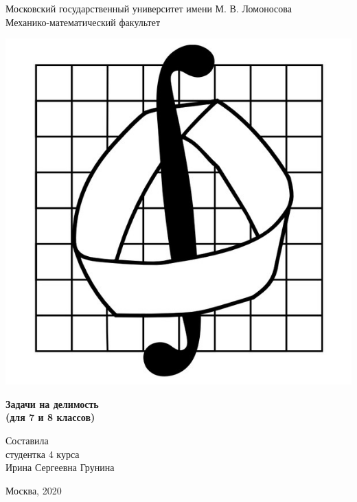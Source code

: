 \thispagestyle {empty}

\begin {center}
    Московский государственный университет имени М. В. Ломоносова \\
    Механико-математический факультет
\end {center}

\vspace*{\fill}

\begin {center}
    \includegraphics [width = 0.3 \textwidth] {image/mm-logo.jpg}
\end {center}

\vspace*{\fill}

\begin {center}
    \LARGE{\textbf{Задачи на делимость\\(для 7 и 8 классов)}}
\end {center}

\vspace*{\fill}

\begin {center}
    Составила \\
    студентка 4 курса \\
    Ирина Сергеевна Грунина
\end {center}

\vspace*{\fill}

\begin {center}
    Москва, 2020
\end {center}

\pagebreak